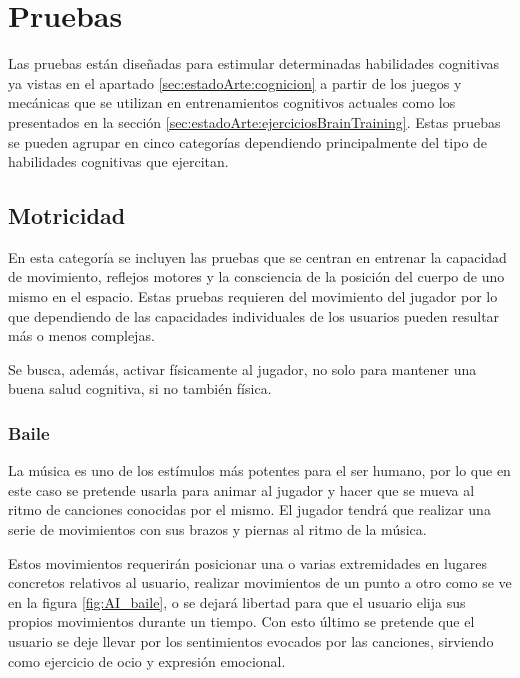 \section{Pruebas}
Las pruebas están diseñadas para estimular determinadas habilidades cognitivas ya vistas en el apartado \ref{sec:estadoArte:cognicion} a partir de los juegos y mecánicas que se utilizan en entrenamientos cognitivos actuales como los presentados en la sección \ref{sec:estadoArte:ejerciciosBrainTraining}.
Estas pruebas se pueden agrupar en cinco categorías dependiendo principalmente del tipo de habilidades cognitivas que ejercitan.



\subsection{Motricidad}

En esta categoría se incluyen las pruebas que se centran en entrenar la capacidad de movimiento, reflejos motores y la consciencia de la posición del cuerpo de uno mismo en el espacio. Estas pruebas requieren del movimiento del jugador por lo que dependiendo de las capacidades individuales de los usuarios pueden resultar más o menos complejas. 

Se busca, además, activar físicamente al jugador, no solo para mantener una buena salud cognitiva, si no también física.

\subsubsection{Baile}

La música es uno de los estímulos más potentes para el ser humano, por lo que en este caso se pretende usarla para animar al jugador y hacer que se mueva al ritmo de canciones conocidas por el mismo. El jugador tendrá que realizar una serie de movimientos con sus brazos y piernas al ritmo de la música. 

Estos movimientos requerirán posicionar una o varias extremidades en lugares concretos relativos al usuario, realizar movimientos de un punto a otro como se ve en la figura \ref{fig:AI_baile}, o se dejará libertad para que el usuario elija sus propios movimientos durante un tiempo. Con esto último se pretende que el usuario se deje llevar por los sentimientos evocados por las canciones, sirviendo como ejercicio de ocio y expresión emocional.

